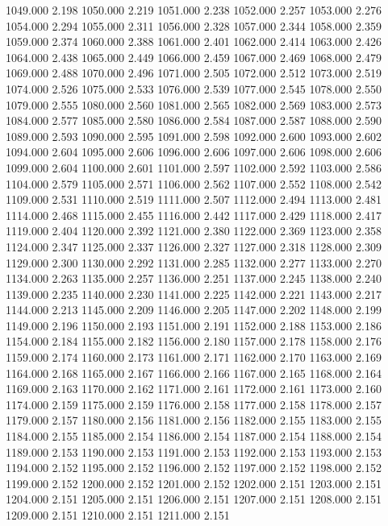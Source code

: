 1049.000 2.198 
1050.000 2.219 
1051.000 2.238 
1052.000 2.257 
1053.000 2.276 
1054.000 2.294 
1055.000 2.311 
1056.000 2.328 
1057.000 2.344 
1058.000 2.359 
1059.000 2.374 
1060.000 2.388 
1061.000 2.401 
1062.000 2.414 
1063.000 2.426 
1064.000 2.438 
1065.000 2.449 
1066.000 2.459 
1067.000 2.469 
1068.000 2.479 
1069.000 2.488 
1070.000 2.496 
1071.000 2.505 
1072.000 2.512 
1073.000 2.519 
1074.000 2.526 
1075.000 2.533 
1076.000 2.539 
1077.000 2.545 
1078.000 2.550 
1079.000 2.555 
1080.000 2.560 
1081.000 2.565 
1082.000 2.569 
1083.000 2.573 
1084.000 2.577 
1085.000 2.580 
1086.000 2.584 
1087.000 2.587 
1088.000 2.590 
1089.000 2.593 
1090.000 2.595 
1091.000 2.598 
1092.000 2.600 
1093.000 2.602 
1094.000 2.604 
1095.000 2.606 
1096.000 2.606 
1097.000 2.606 
1098.000 2.606 
1099.000 2.604 
1100.000 2.601 
1101.000 2.597 
1102.000 2.592 
1103.000 2.586 
1104.000 2.579 
1105.000 2.571 
1106.000 2.562 
1107.000 2.552 
1108.000 2.542 
1109.000 2.531 
1110.000 2.519 
1111.000 2.507 
1112.000 2.494 
1113.000 2.481 
1114.000 2.468 
1115.000 2.455 
1116.000 2.442 
1117.000 2.429 
1118.000 2.417 
1119.000 2.404 
1120.000 2.392 
1121.000 2.380 
1122.000 2.369 
1123.000 2.358 
1124.000 2.347 
1125.000 2.337 
1126.000 2.327 
1127.000 2.318 
1128.000 2.309 
1129.000 2.300 
1130.000 2.292 
1131.000 2.285 
1132.000 2.277 
1133.000 2.270 
1134.000 2.263 
1135.000 2.257 
1136.000 2.251 
1137.000 2.245 
1138.000 2.240 
1139.000 2.235 
1140.000 2.230 
1141.000 2.225 
1142.000 2.221 
1143.000 2.217 
1144.000 2.213 
1145.000 2.209 
1146.000 2.205 
1147.000 2.202 
1148.000 2.199 
1149.000 2.196 
1150.000 2.193 
1151.000 2.191 
1152.000 2.188 
1153.000 2.186 
1154.000 2.184 
1155.000 2.182 
1156.000 2.180 
1157.000 2.178 
1158.000 2.176 
1159.000 2.174 
1160.000 2.173 
1161.000 2.171 
1162.000 2.170 
1163.000 2.169 
1164.000 2.168 
1165.000 2.167 
1166.000 2.166 
1167.000 2.165 
1168.000 2.164 
1169.000 2.163 
1170.000 2.162 
1171.000 2.161 
1172.000 2.161 
1173.000 2.160 
1174.000 2.159 
1175.000 2.159 
1176.000 2.158 
1177.000 2.158 
1178.000 2.157 
1179.000 2.157 
1180.000 2.156 
1181.000 2.156 
1182.000 2.155 
1183.000 2.155 
1184.000 2.155 
1185.000 2.154 
1186.000 2.154 
1187.000 2.154 
1188.000 2.154 
1189.000 2.153 
1190.000 2.153 
1191.000 2.153 
1192.000 2.153 
1193.000 2.153 
1194.000 2.152 
1195.000 2.152 
1196.000 2.152 
1197.000 2.152 
1198.000 2.152 
1199.000 2.152 
1200.000 2.152 
1201.000 2.152 
1202.000 2.151 
1203.000 2.151 
1204.000 2.151 
1205.000 2.151 
1206.000 2.151 
1207.000 2.151 
1208.000 2.151 
1209.000 2.151 
1210.000 2.151 
1211.000 2.151 

